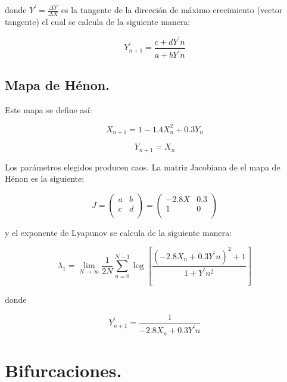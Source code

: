 \documentclass[prodmode,acmtap]{acmlarge}
\begin{document}
donde $Y^{'} = \frac{\Delta Y}{\Delta X}$ es la tangente de la dirección de máximo crecimiento (vector tangente) el cual se calcula de la siguiente manera:

\begin{equation}
Y^{'}_{n+1}= \frac{c+dY^{'}n}{ a+bY^{'}n}
\end{equation}


\subsection{Mapa de Hénon.}


Este mapa se define así:

\begin{equation}
X_{n+1}= 1- 1.4 X_{n}^{2}+ 0.3 Y_{n}
\end{equation}

\begin{equation}
Y_{n+1}=  X_{n}
\end{equation}


Los parámetros elegidos producen caos. 
La matriz Jacobiana de el mapa de Hénon es la siguiente:

\begin{equation}
J= \left( \begin{array}{cc}
a & b  \\
c & d  \\
\end{array} \right)  
= 
\left( \begin{array}{cc}
-2.8X & 0.3  \\
1 & 0  \\
\end{array} \right) 
\end{equation}

y el exponente de Lyapunov se calcula de la siguiente manera:

\begin{equation}
\lambda_{1}= \lim_{N \rightarrow \infty}\frac{1}{2N} \sum_{n=0}^{N-1}\log \left[ \frac{(-2.8X_{n} + 0.3Y ^{'}n )^{2} + 1 }{1+Y^{'}n^{2}}  \right]
\end{equation}

donde 

\begin{equation}
Y^{'}_{n+1}= \frac{1}{-2.8X_{n} + 0.3Y^{'}n }
\end{equation}

\section{Bifurcaciones.}
\end{document}
